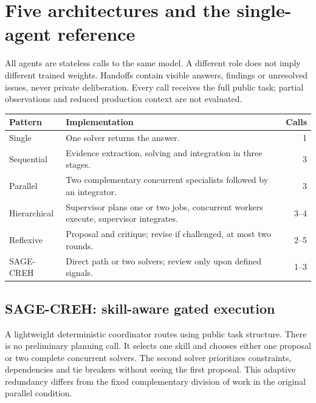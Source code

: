 \documentclass[11pt,a4paper]{article}
\begin{document}
\section{Five architectures and the single-agent reference}
All agents are stateless calls to the same model. A different role does not imply
different trained weights. Handoffs contain visible answers, findings or unresolved
issues, never private deliberation. Every call receives the full public task;
partial observations and reduced production context are not evaluated.

\begin{center}\small
\begin{tabularx}{\linewidth}{@{}p{25mm}Xr@{}}
\toprule Pattern & Implementation & Calls \\ \midrule
Single & One solver returns the answer. & 1 \\
Sequential & Evidence extraction, solving and integration in three stages. & 3 \\
Parallel & Two complementary concurrent specialists followed by an integrator. & 3 \\
Hierarchical & Supervisor plans one or two jobs, concurrent workers execute, supervisor integrates. & 3--4 \\
Reflexive & Proposal and critique; revise if challenged, at most two rounds. & 2--5 \\
SAGE-CREH & Direct path or two solvers; review only upon defined signals. & 1--3 \\
\bottomrule
\end{tabularx}\end{center}

\subsection{SAGE-CREH: skill-aware gated execution}
A lightweight deterministic coordinator routes using public task structure. There
is no preliminary planning call. It selects one skill and chooses either one
proposal or two complete concurrent solvers. The second solver prioritizes
constraints, dependencies and tie breakers without seeing the first proposal.
This adaptive redundancy differs from the fixed complementary division of work
in the original parallel condition.
\end{document}
